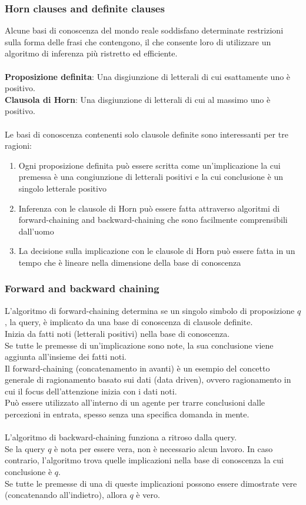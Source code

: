 \documentclass[../main.tex]{subfiles}
\begin{document}
	\subsubsection{Horn clauses and definite clauses}
	Alcune basi di conoscenza del mondo reale soddisfano determinate restrizioni sulla forma delle frasi che contengono, il che consente loro di utilizzare un algoritmo di inferenza più ristretto ed efficiente.\\\\
	\textbf{Proposizione definita}: Una disgiunzione di letterali di cui esattamente uno è positivo.\\
	\textbf{Clausola di Horn}: Una disgiunzione di letterali di cui al massimo uno è positivo.\\\\
	Le basi di conoscenza contenenti solo clausole definite sono interessanti per tre ragioni:
	\begin{enumerate}
		\item Ogni proposizione definita può essere scritta come un'implicazione la cui premessa è una congiunzione di letterali positivi e la cui conclusione è un singolo letterale positivo
		\item Inferenza con le clausole di Horn può essere fatta attraverso algoritmi di forward-chaining and backward-chaining che sono facilmente comprensibili dall'uomo
		\item La decisione sulla implicazione con le clausole di Horn può essere fatta in un tempo che è lineare nella dimensione della base di conoscenza
	\end{enumerate}
	\subsubsection{Forward and backward chaining}
	L'algoritmo di forward-chaining determina se un singolo simbolo di proposizione $q$, la query, è implicato da una base di conoscenza di clausole definite.\\
	Inizia da fatti noti (letterali positivi) nella base di conoscenza.\\
	Se tutte le premesse di un'implicazione sono note, la sua conclusione viene aggiunta all'insieme dei fatti noti.\\
	Il forward-chaining (concatenamento in avanti) è un esempio del concetto generale di ragionamento basato sui dati (data driven), ovvero ragionamento in cui il focus dell'attenzione inizia con i dati noti. \\
	Può essere utilizzato all'interno di un agente per trarre conclusioni dalle percezioni in entrata, spesso senza una specifica domanda in mente.\\\\
	L'algoritmo di backward-chaining funziona a ritroso dalla query.\\ Se la query $q$ è nota per essere vera, non è necessario alcun lavoro. In caso contrario, l'algoritmo trova quelle implicazioni nella base di conoscenza la cui conclusione è $q$. \\
	Se tutte le premesse di una di queste implicazioni possono essere dimostrate vere (concatenando all'indietro), allora $q$ è vero.
\end{document}
